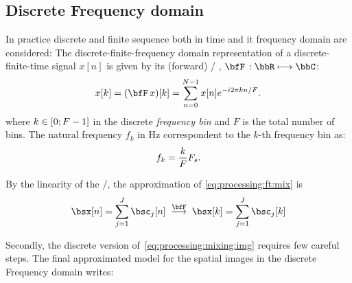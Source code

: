 \subsection{Discrete Frequency domain}
In practice discrete and finite sequence both in time and it frequency domain are considered:
The discrete-finite-frequency domain representation of a discrete-finite-time signal $x[n]$ is given by its (forward) \DFTdef/
,
$\discreteFT{}:\bbR\kmapsto\bbC$:
\begin{equation}\label{eq:processing:dft}
    x[k] = (\discreteFT{x})[k] =
    \sum_{n = 0}^{N - 1}
    x[n]
    \cste^{-\csti2\pi k n / F}.
\end{equation}
where $k \in \kintervcc{0}{F - 1}$ in the discrete \textit{frequency bin} and $F$ is the total number of bins.
The natural frequency $f_k$ in $\si{\Hz}$ correspondent to the $k$-th frequency bin as:
\begin{equation}
    f_k = \frac{k}{F}F_s
    .
\end{equation}


By the linearity of the \DFT/, the approximation of \cref{eq:processing:ft:mix} is
\begin{equation}\label{eq:processing:dft:mix}
    \mics[ n] = \sum_{\idxSrc=1}^{\numSrcs} \imgs_\idxSrc[ n]
    \;\overset{\discreteFT}{\kto}\;
    \mics[ k] = \sum_{\idxSrc=1}^{\numSrcs} \imgs_\idxSrc[ k]
\end{equation}

Secondly, the discrete version of~\cref{eq:processing:mixing:img} requires few careful steps.
The final approximated model for the spatial images in the discrete Frequency domain writes:

